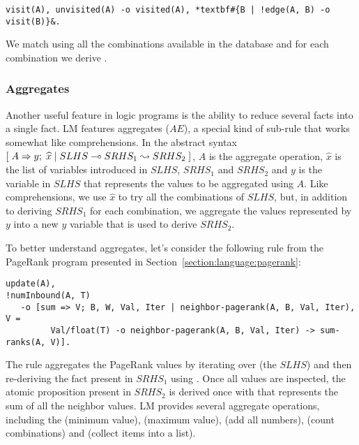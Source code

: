 \begin{Verbatim}[fontsize=\codesize,commandchars=\*\#\&]
visit(A), unvisited(A) -o visited(A), *textbf#{B | !edge(A, B) -o visit(B)}&.
\end{Verbatim}

We match  using all the combinations available in the database
and for each combination we derive .

\subsubsection{Aggregates}

Another useful feature in logic programs is the ability to reduce several facts
into a single fact. LM features aggregates ($AE$), a special kind of sub-rule
that works somewhat like comprehensions. In the abstract syntax
$[\; A \Rightarrow y; \; \widehat{x} \; | \; SLHS \multimap SRHS_1 \leadsto SRHS_2 \;]$, $A$ is the aggregate
operation, $\widehat{x}$ is the list of variables introduced in $SLHS$, $SRHS_1$
and $SRHS_2$ and $y$ is the variable in $SLHS$ that represents the values to be
aggregated using $A$. Like comprehensions, we use $\widehat{x}$ to try all the
combinations of $SLHS$, but, in addition to deriving $SRHS_1$ for each
combination, we aggregate the values represented by $y$ into a new $y$ variable
that is used to derive $SRHS_2$.

To better understand aggregates, let's consider the following rule from the
PageRank program presented in Section~\ref{section:language:pagerank}:

\begin{Verbatim}[fontsize=\codesize]
update(A),
!numInbound(A, T)
   -o [sum => V; B, W, Val, Iter | neighbor-pagerank(A, B, Val, Iter), V =
         Val/float(T) -o neighbor-pagerank(A, B, Val, Iter) -> sum-ranks(A, V)].
\end{Verbatim}

The rule aggregates the PageRank values  by iterating over
 (the $SLHS$) and then re-deriving the
fact present in $SRHS_1$ using . Once all
values are inspected, the atomic proposition  present in
$SRHS_2$ is derived once with  that represents the sum of all the
neighbor values. LM provides several aggregate operations, including the
 (minimum value),  (maximum value),  (add all
numbers),  (count combinations) and  (collect items
into a list).


